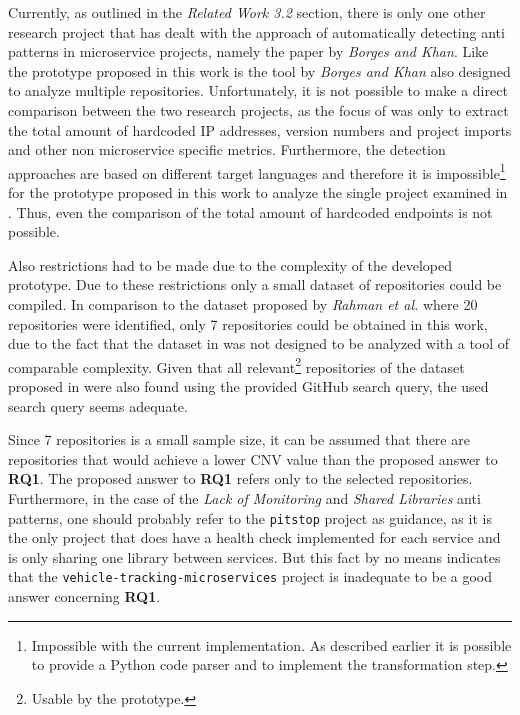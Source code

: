 \documentclass{article}
\begin{document}
Currently, as outlined in the \textit{Related Work 3.2} section, there is only one other research project that has dealt with the approach of automatically detecting anti patterns in microservice projects, namely the paper \cite{borges_algorithm_2019} by \textit{Borges and Khan}.
Like the prototype proposed in this work is the tool by \textit{Borges and Khan} also designed to analyze multiple repositories.
Unfortunately, it is not possible to make a direct comparison between the two research projects, as the focus of \cite{borges_algorithm_2019} was only to extract the total amount of hardcoded IP addresses, version numbers and project imports and other non microservice specific metrics.
Furthermore, the detection approaches are based on different target languages and therefore it is impossible\footnote{Impossible with the current implementation. As described earlier it is possible to provide a Python code parser and to implement the transformation step.} for the prototype proposed in this work to analyze the single project examined in \cite{borges_algorithm_2019}. Thus, even the comparison of the total amount of hardcoded endpoints is not possible. \newline

Also restrictions had to be made due to the complexity of the developed prototype.
Due to these restrictions only a small dataset of repositories could be compiled.
In comparison to the dataset proposed by \textit{Rahman et al.} \cite{imranur_curated_2019} where 20 repositories were identified, only 7 repositories could be obtained in this work, due to the fact that the dataset in \cite{imranur_curated_2019} was not designed to be analyzed with a tool of comparable complexity.
Given that all relevant\footnote{Usable by the prototype.} repositories of the dataset proposed in \cite{imranur_curated_2019} were also found using the provided GitHub search query, the used search query seems adequate. \newline

Since 7 repositories is a small sample size, it can be assumed that there are repositories that would achieve a lower CNV value than the proposed answer to \textbf{RQ1}.
The proposed answer to \textbf{RQ1} refers only to the selected repositories.
Furthermore, in the case of the \textit{Lack of Monitoring} and \textit{Shared Libraries} anti patterns, one should probably refer to the \lstinline{pitstop} project as guidance, as it is the only project that does have a health check implemented for each service and is only sharing one library between services.
But this fact by no means indicates that the \lstinline{vehicle-tracking-microservices} project is inadequate to be a good answer concerning \textbf{RQ1}. \newline
\end{document}
